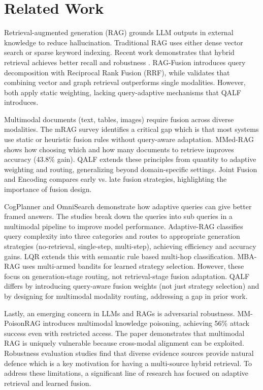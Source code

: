 \documentclass[11pt]{article}
\begin{document}
\section{Related Work}

Retrieval-augmented generation (RAG) grounds LLM outputs in external knowledge to reduce hallucination. Traditional RAG uses either dense vector search or sparse keyword indexing. Recent work demonstrates that hybrid retrieval achieves better recall and robustness \cite{lee_hybgrag_2025}. RAG-Fusion \cite{rackauckas_rag-fusion_2024} introduces query decomposition with Reciprocal Rank Fusion (RRF), while \cite{ahmad_benchmarking_2025} validates that combining vector and graph retrieval outperforms single modalities. However, both apply static weighting, lacking query-adaptive mechanisms that QALF introduces.

Multimodal documents (text, tables, images) require fusion across diverse modalities. The mRAG survey \cite{mei_survey_2025} identifies a critical gap which is that most systems use static or heuristic fusion rules without query-aware adaptation. MMed-RAG \cite{xia_mmed-rag_2025} shows how choosing which and how many documents to retrieve improves accuracy (43.8\% gain). QALF extends these principles from quantity to adaptive weighting and routing, generalizing beyond domain-specific settings. Joint Fusion and Encoding \cite{huang_joint_2025} compares early vs. late fusion strategies, highlighting the importance of fusion design.

CogPlanner \cite{yu_cogplanner_2025} and OmniSearch \cite{li_benchmarking_2025} demonstrate how adaptive queries can give better framed answers. The studies break down the queries into sub queries in a multimodal pipeline to improve model performance. Adaptive-RAG \cite{jeong_adaptive-rag_2024} classifies query complexity into three categories and routes to appropriate generation strategies (no-retrieval, single-step, multi-step), achieving efficiency and accuracy gains. LQR \cite{huang_layered_2024} extends this with semantic rule based multi-hop classification. MBA-RAG \cite{tang_mba-rag_2025} uses multi-armed bandits for learned strategy selection. However, these focus on generation-stage routing, not retrieval-stage fusion adaptation. QALF differs by introducing query-aware fusion weights (not just strategy selection) and by designing for multimodal modality routing, addressing a gap in prior work.

Lastly, an emerging concern in LLMs and RAGs is adversarial robustness. MM-PoisonRAG \cite{ha_mm-poisonrag_2025} introduces multimodal knowledge poisoning, achieving 56\% attack success even with restricted access. The paper demonstrates that multimodal RAG is uniquely vulnerable because cross-modal alignment can be exploited. Robustness evaluation studies \cite{amirshahi_evaluating_2025} find that diverse evidence sources provide natural defence which is a key motivation for having a multi-source hybrid retrieval. To address these limitations, a significant line of research has focused on adaptive retrieval and learned fusion.
\end{document}
